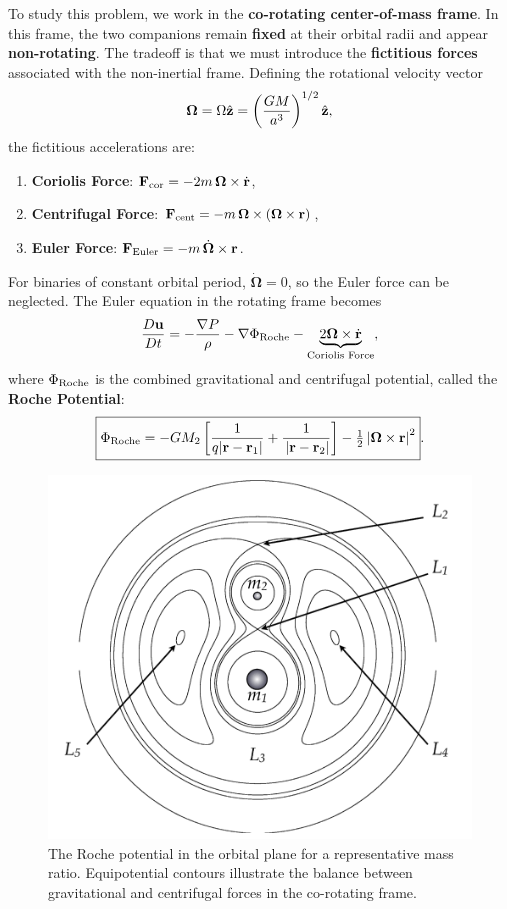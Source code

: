 To study this problem, we work in the \textbf{co-rotating center-of-mass frame}. In this frame, the two companions remain \textbf{fixed} at their orbital radii and appear \textbf{non-rotating}. The tradeoff is that we must introduce the \textbf{fictitious forces} associated with the non-inertial frame. Defining the rotational velocity vector
\[
\boldsymbol{\Omega} = \Omega \hat{\bf z} 
= \left(\frac{GM}{a^3}\right)^{1/2}\hat{\bf z},
\]
the fictitious accelerations are:
\vspace{0.5cm}
\begin{enumerate}
    \item \textbf{Coriolis Force}: ${\bf F}_{\rm cor} = -2m\, \boldsymbol{\Omega} \times \dot{\bf r}$,
    \item \textbf{Centrifugal Force}: ${\bf F}_{\rm cent} = -m\, \boldsymbol{\Omega} \times (\boldsymbol{\Omega} \times {\bf r})$,
    \item \textbf{Euler Force}: ${\bf F}_{\rm Euler} = -m\, \dot{\boldsymbol{\Omega}} \times {\bf r}$.
\end{enumerate}
\vspace{0.5cm}

For binaries of constant orbital period, $\dot{\boldsymbol{\Omega}}=0$, so the Euler force can be neglected. The Euler equation in the rotating frame becomes
\[
\frac{D{\bf u}}{Dt} = - \frac{\nabla P}{\rho} - \nabla \Phi_{\rm Roche} - \underbrace{2 \boldsymbol{\Omega} \times \dot{\bf r}}_{\text{Coriolis Force}},
\]
where $\Phi_{\rm Roche}$ is the combined gravitational and centrifugal potential, called the \textbf{Roche Potential}:
\begin{equation}
    \label{eq:roche_potential}
    \boxed{
    \Phi_{\rm Roche} =
    - GM_2 \left[\frac{1}{q|{\bf r} - {\bf r}_1|} + \frac{1}{\,|{\bf r}-{\bf r}_2|}\right]
    - \tfrac{1}{2}\left|\boldsymbol{\Omega}\times{\bf r}\right|^2
    }.
\end{equation}

\begin{figure}
    \centering
    \includegraphics[width=0.75\linewidth]{Pictures/figures/roche_potential.png}
    \caption{The Roche potential in the orbital plane for a representative mass ratio. Equipotential contours illustrate the balance between gravitational and centrifugal forces in the co-rotating frame.}
    \label{fig:roche_potential}
\end{figure}

